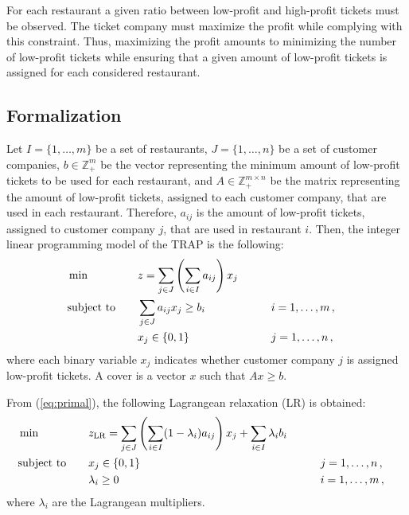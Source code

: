 \documentclass[runningheads]{llncs}
\begin{document}
For each restaurant a given ratio between low-profit and high-profit tickets must be observed. 
The ticket company must maximize the profit while complying with this constraint. Thus, maximizing the profit amounts to minimizing the number of low-profit tickets while ensuring that a given amount of low-profit tickets is assigned for each considered restaurant.

\subsection{Formalization}
\label{subsec:problem:formalization}

Let $I = \{1,\dots,m\}$ be a set of restaurants, $J = \{1,\dots,n\}$ be a set of customer companies, $b \in \mathbb{Z}_{+}^{m}$ be the vector representing the minimum amount of low-profit tickets to be used for each restaurant, and $A \in \mathbb{Z}_{+}^{m \times n}$ be the matrix representing the amount of low-profit tickets, assigned to each customer company, that are used in each restaurant. Therefore, $a_{ij}$ is the amount of low-profit tickets, assigned to customer company $j$, that are used in restaurant $i$. Then, the integer linear programming model of the TRAP is the following:
\begin{alignat}{3}
  &\min & \quad & z = \sum_{j \in J} \left( \sum_{i \in I} a_{ij} \right) x_j \label{eq:primal}\\
  &\text{subject to}  &       & \sum_{j \in J} a_{ij} x_j \ge b_i & \qquad & i = 1,\dots,m \, , \notag\\
  &                   &       & x_j \in \{0,1\}  &\qquad& j = 1,\dots,n \, , \notag
\end{alignat}
where each binary variable $x_j$ indicates whether customer company $j$ is assigned low-profit tickets. A cover is a vector $x$ such that $Ax \ge b$.

From (\ref{eq:primal}), the following Lagrangean relaxation (LR) is obtained:
\begin{alignat}{3}
  &\min & \quad & z_{\text{LR}} = \sum_{j \in J} \left( \sum_{i \in I} (1 - \lambda_i) a_{ij} \right) x_j + \sum_{i \in I} \lambda_i b_i \label{eq:lagrangean}\\
  &\text{subject to}  &       & x_j \in \{0,1\} & \qquad & j = 1,\dots,n \, , \notag\\
  &                   &       & \lambda_i \ge 0  & \qquad & i = 1,\dots,m \, , \notag
\end{alignat}
where $\lambda_i$ are the Lagrangean multipliers.
\end{document}
